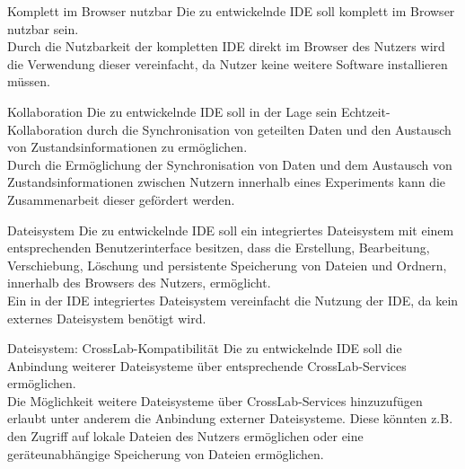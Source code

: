 \begin{requirement}{Komplett im Browser nutzbar}
  \reqdescription Die zu entwickelnde IDE soll komplett im Browser nutzbar sein. \\
  \reqrationale Durch die Nutzbarkeit der kompletten IDE direkt im Browser des Nutzers wird die Verwendung dieser vereinfacht, da Nutzer keine weitere Software installieren müssen. \\
\end{requirement}

\begin{requirement}{Kollaboration}
  \reqdescription Die zu entwickelnde IDE soll in der Lage sein Echtzeit-Kollaboration durch die Synchronisation von geteilten Daten und den Austausch von Zustandsinformationen zu ermöglichen. \\
  \reqrationale Durch die Ermöglichung der Synchronisation von Daten und dem Austausch von Zustandsinformationen zwischen Nutzern innerhalb eines Experiments kann die Zusammenarbeit dieser gefördert werden. \\
\end{requirement}

\begin{requirement}{Dateisystem}
  \reqdescription Die zu entwickelnde IDE soll ein integriertes Dateisystem mit einem entsprechenden Benutzerinterface besitzen, dass die Erstellung, Bearbeitung, Verschiebung, Löschung und persistente Speicherung von Dateien und Ordnern, innerhalb des Browsers des Nutzers, ermöglicht. \\
  \reqrationale Ein in der IDE integriertes Dateisystem vereinfacht die Nutzung der IDE, da kein externes Dateisystem benötigt wird. \\
\end{requirement}

\begin{requirement}{Dateisystem: CrossLab-Kompatibilität}
  \reqdescription Die zu entwickelnde IDE soll die Anbindung weiterer Dateisysteme über entsprechende CrossLab-Services ermöglichen. \\
  \reqrationale Die Möglichkeit weitere Dateisysteme über CrossLab-Services hinzuzufügen erlaubt unter anderem die Anbindung externer Dateisysteme. Diese könnten z.B. den Zugriff auf lokale Dateien des Nutzers ermöglichen oder eine geräteunabhängige Speicherung von Dateien ermöglichen. \\
\end{requirement}

